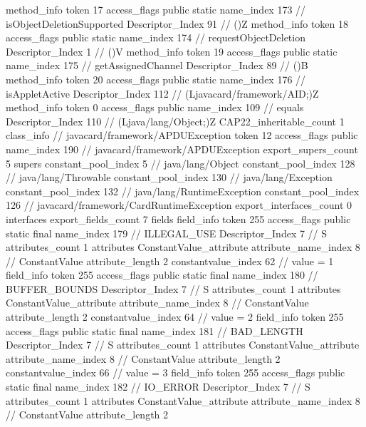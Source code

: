 {{{{{				}
				method_info {
					token	17
					access_flags	public static
					name_index	173		// isObjectDeletionSupported
					Descriptor_Index	91		// ()Z
				}
				method_info {
					token	18
					access_flags	public static
					name_index	174		// requestObjectDeletion
					Descriptor_Index	1		// ()V
				}
				method_info {
					token	19
					access_flags	public static
					name_index	175		// getAssignedChannel
					Descriptor_Index	89		// ()B
				}
				method_info {
					token	20
					access_flags	public static
					name_index	176		// isAppletActive
					Descriptor_Index	112		// (Ljavacard/framework/AID;)Z
				}
				method_info {
					token	0
					access_flags	public
					name_index	109		// equals
					Descriptor_Index	110		// (Ljava/lang/Object;)Z
				}
			}
			CAP22_inheritable_count	1
		}
		class_info {		// javacard/framework/APDUException
			token	12
			access_flags	public
			name_index	190		// javacard/framework/APDUException
			export_supers_count	5
			supers {
				constant_pool_index	5		// java/lang/Object
				constant_pool_index	128		// java/lang/Throwable
				constant_pool_index	130		// java/lang/Exception
				constant_pool_index	132		// java/lang/RuntimeException
				constant_pool_index	126		// javacard/framework/CardRuntimeException
			}
			export_interfaces_count	0
			interfaces {
			}
			export_fields_count	7
			fields {
			field_info {
				token	255
				access_flags	public static final
				name_index	179		// ILLEGAL_USE
				Descriptor_Index	7		// S
				attributes_count	1
				attributes {
				ConstantValue_attribute {
					attribute_name_index	8		// ConstantValue
					attribute_length	2
					constantvalue_index	62		// value = 1
				}
				}
			}
			field_info {
				token	255
				access_flags	public static final
				name_index	180		// BUFFER_BOUNDS
				Descriptor_Index	7		// S
				attributes_count	1
				attributes {
				ConstantValue_attribute {
					attribute_name_index	8		// ConstantValue
					attribute_length	2
					constantvalue_index	64		// value = 2
				}
				}
			}
			field_info {
				token	255
				access_flags	public static final
				name_index	181		// BAD_LENGTH
				Descriptor_Index	7		// S
				attributes_count	1
				attributes {
				ConstantValue_attribute {
					attribute_name_index	8		// ConstantValue
					attribute_length	2
					constantvalue_index	66		// value = 3
				}
				}
			}
			field_info {
				token	255
				access_flags	public static final
				name_index	182		// IO_ERROR
				Descriptor_Index	7		// S
				attributes_count	1
				attributes {
				ConstantValue_attribute {
					attribute_name_index	8		// ConstantValue
					attribute_length	2
}}}}}}}
